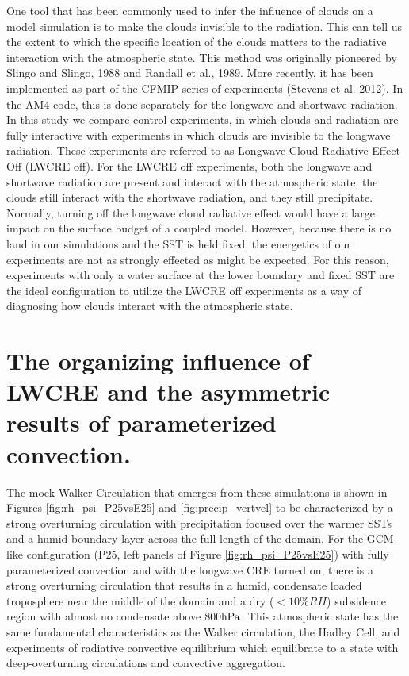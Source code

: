 \documentclass[draft]{agujournal2019}
\begin{document}
One tool that has been commonly used to infer the influence of clouds on a model simulation is to make the clouds invisible to the 
radiation.  This can tell us the extent to which the specific location of the clouds matters to the radiative interaction with the 
atmospheric state.   This method was originally pioneered by Slingo and Slingo, 1988 and Randall et al., 1989.  More recently, it has been
implemented as part of the CFMIP series of experiments (Stevens et al. 2012).
In the AM4 code, this is done separately for the longwave and shortwave radiation.  In this study we compare control experiments, 
in which clouds and radiation are fully interactive with experiments in which clouds are invisible to the longwave radiation.  These 
experiments are referred to as Longwave Cloud Radiative Effect Off (LWCRE off).  
For the LWCRE off experiments, both the longwave and shortwave radiation are present and interact with 
the atmospheric state, the clouds still interact with the shortwave radiation, and they still precipitate.   
Normally, turning off the longwave cloud radiative effect would have a large impact on the surface budget of a coupled model.  
However, because there is no land in our simulations and the SST is held fixed, the energetics of our experiments are not as
strongly effected as might be expected.  For this reason, experiments with only a water surface at the lower boundary and 
fixed SST are the ideal configuration to utilize the LWCRE off experiments as a way of diagnosing how clouds interact with 
the atmospheric state.  

\section{The organizing influence of LWCRE and the asymmetric results of parameterized convection.}

The mock-Walker Circulation that emerges from these simulations is shown in Figures \ref{fig:rh_psi_P25vsE25} and 
\ref{fig:precip_vertvel} to be characterized by a strong overturning circulation with precipitation focused over the warmer 
SSTs and a humid boundary layer across the full length of the domain.   For the GCM-like configuration (P25, left panels 
of Figure \ref{fig:rh_psi_P25vsE25}) with fully parameterized convection and with the longwave CRE turned on, there is 
a strong overturning circulation that results in a humid, condensate loaded troposphere near the middle of the domain 
and a dry ($< 10\% RH$) subsidence region with almost no condensate above $800 \rm{hPa}$.    
This atmospheric state has the same fundamental characteristics as the Walker circulation, the Hadley Cell, and 
experiments of radiative convective equilibrium which equilibrate to a state with deep-overturning circulations and 
convective aggregation.
\end{document}
